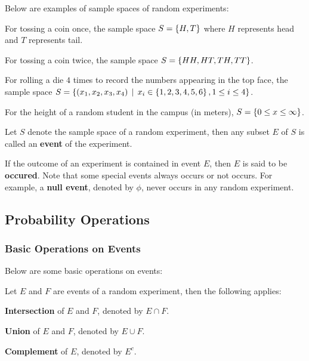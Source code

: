 \documentclass[a4paper,12pt]{article}
\begin{document}
\begin{exm}
  Below are examples of sample spaces of random experiments:

  \begin{alist}
    \item For tossing a coin once, the sample space $S=\left\{ H,T\right\}$ where $H$ represents head and $T$ represents tail.
    \item For tossing a coin twice, the sample space $S=\left\{ HH, HT, TH, TT\right\}$.
    \item For rolling a die $4$ times to record the numbers appearing in the top face, the sample space $S=\left\{ (x_{1},x_{2},x_{3},x_{4})\,\mid\, x_{i}\in\left\{ 1,2,3,4,5,6\right\},1\leq i\leq 4\right\}$.
    \item For the height of a random student in the campus (in meters), $S=\left\{ 0\leq x\leq\infty\right\}$.
  \end{alist}
\end{exm}\n

\begin{dft}
  Let $S$ denote the sample space of a random experiment, then any subset $E$ of $S$ is called an \textbf{event} of the experiment.
\end{dft}\n

If the outcome of an experiment is contained in event $E$, then $E$ is said to be \textbf{occured}. Note that some special events always occurs or not occurs. For example, a \textbf{null event}, denoted by $\phi$, never occurs in any random experiment.

\subsection{Probability Operations}
\subsubsection{Basic Operations on Events}
Below are some basic operations on events:\n

\begin{pst}
  Let $E$ and $F$ are events of a random experiment, then the following applies:

  \begin{alist}
    \item \textbf{Intersection} of $E$ and $F$, denoted by $E\cap F$.
    \item \textbf{Union} of $E$ and $F$, denoted by $E\cup F$.
    \item \textbf{Complement} of $E$, denoted by $E^{c}$.
  \end{alist}
\end{pst}\n
\end{document}
